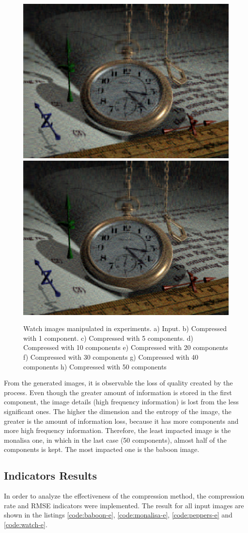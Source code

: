 \documentclass[]{IEEEtran}
\begin{document}
\begin{figure}[h]
  \includegraphics[width=0.4\hsize]{../output/watch_40.png}
  \includegraphics[width=0.4\hsize]{../output/watch_50.png}
  \caption{Watch images manipulated in experiments. a) Input. b) Compressed with 1 component. c) Compressed with 5 components. d) Compressed with 10 components e) Compressed with 20 components f) Compressed with 30 components g) Compressed with 40 components h) Compressed with 50 components}
  \label{fig:effect-watch}
\end{figure}

From the generated images, it is observable the loss of quality created by the process. Even though the greater amount of information is stored in the first component, the image details (high frequency information) is lost from the less significant ones. The higher the dimension and the entropy of the image, the greater is the amount of information loss, because it has more components and more high frequency information. Therefore, the least impacted image is the monalisa one, in which in the last case (50 components), almost half of the components is kept. The most impacted one is the baboon image.  

\subsection{Indicators Results}

In order to analyze the effectiveness of the compression method, the compression rate and RMSE indicators were implemented. The result for all input images are shown in the listings \ref{code:baboon-e}, \ref{code:monalisa-e}, \ref{code:peppers-e} and \ref{code:watch-e}.
\end{document}
